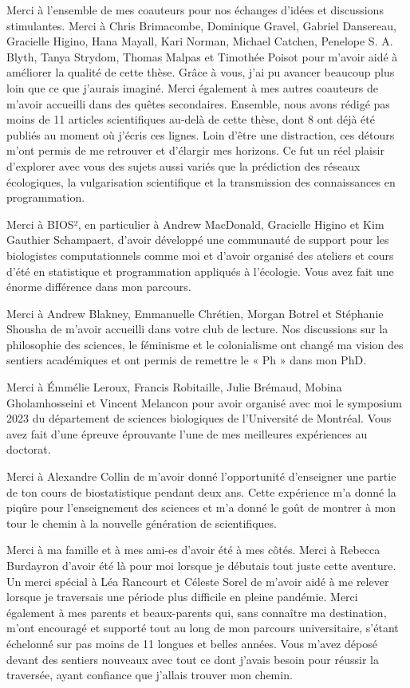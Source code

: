\documentclass[12pt,twoside,phd]{dms}
\numberwithin{equation}{section}
\numberwithin{table}{chapter}
\numberwithin{figure}{chapter}
\begin{document}
Merci à l'ensemble de mes coauteurs pour nos échanges d'idées et discussions
stimulantes. Merci à Chris Brimacombe, Dominique Gravel, Gabriel Dansereau,
Gracielle Higino, Hana Mayall, Kari Norman, Michael Catchen, Penelope S. A.
Blyth, Tanya Strydom, Thomas Malpas et Timothée Poisot pour m'avoir aidé à
améliorer la qualité de cette thèse. Grâce à vous, j'ai pu avancer beaucoup plus
loin que ce que j'aurais imaginé. Merci également à mes autres coauteurs de
m'avoir accueilli dans des quêtes secondaires. Ensemble, nous avons rédigé pas
moins de 11 articles scientifiques au-delà de cette thèse, dont 8 ont déjà été
publiés au moment où j'écris ces lignes. Loin d'être une distraction, ces
détours m'ont permis de me retrouver et d'élargir mes horizons. Ce fut un réel
plaisir d'explorer avec vous des sujets aussi variés que la prédiction des
réseaux écologiques, la vulgarisation scientifique et la transmission des
connaissances en programmation.

Merci à BIOS², en particulier à Andrew MacDonald, Gracielle Higino et Kim
Gauthier Schampaert, d'avoir développé une communauté de support pour les
biologistes computationnels comme moi et d'avoir organisé des ateliers et cours d'été en
statistique et programmation appliqués à l'écologie. Vous avez fait une énorme
différence dans mon parcours.

Merci à Andrew Blakney, Emmanuelle Chrétien, Morgan Botrel et Stéphanie Shousha
de m'avoir accueilli dans votre club de lecture. Nos discussions sur la
philosophie des sciences, le féminisme et le colonialisme ont changé ma vision
des sentiers académiques et ont permis de remettre le « Ph » dans mon PhD. 

Merci à Émmélie Leroux, Francis Robitaille, Julie Brémaud, Mobina Gholamhosseini
et Vincent Melancon pour avoir organisé avec moi le symposium 2023 du
département de sciences biologiques de l'Université de Montréal. Vous avez fait
d'une épreuve éprouvante l'une de mes meilleures expériences au doctorat.

Merci à Alexandre Collin de m'avoir donné l'opportunité d'enseigner une partie
de ton cours de biostatistique pendant deux ans. Cette expérience m'a donné la
piqûre pour l'enseignement des sciences et m'a donné le goût de montrer à mon tour
le chemin à la nouvelle génération de scientifiques.

Merci à ma famille et à mes ami-es d'avoir été à mes côtés. Merci à Rebecca
Burdayron d'avoir été là pour moi lorsque je débutais tout juste cette aventure.
Un merci spécial à Léa Rancourt et Céleste Sorel de m'avoir aidé à me relever
lorsque je traversais une période plus difficile en pleine pandémie. Merci
également à mes parents et beaux-parents qui, sans connaître ma destination,
m'ont encouragé et supporté tout au long de mon parcours universitaire, s'étant
échelonné sur pas moins de 11 longues et belles années. Vous m'avez déposé
devant des sentiers nouveaux avec tout ce dont j'avais besoin pour réussir la
traversée, ayant confiance que j'allais trouver mon chemin.
\end{document}
